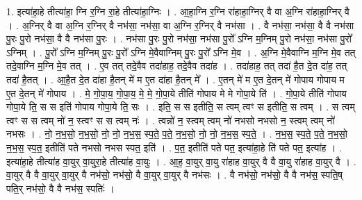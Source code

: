 \documentclass[17pt]{extarticle}
\begin{document}
1. इत्या॑हा॒हे तीत्या॑हा॒ ग्नि र॒ग्नि रा॒हे तीत्या॑हा॒ग्निः । . आ॒हा॒ग्नि र॒ग्नि रा॑हाहा॒ग्निर् वै वा अ॒ग्नि रा॑हाहा॒ग्निर् वै । . अ॒ग्निर् वै वा अ॒ग्नि र॒ग्निर् वै नभ॑सा॒ नभ॑सा॒ वा अ॒ग्नि र॒ग्निर् वै नभ॑सा । . वै नभ॑सा॒ नभ॑सा॒ वै वै नभ॑सा पु॒रः पु॒रो नभ॑सा॒ वै वै नभ॑सा पु॒रः । . नभ॑सा पु॒रः पु॒रो नभ॑सा॒ नभ॑सा पु॒रो᳚ ऽग्नि म॒ग्निम् पु॒रो नभ॑सा॒ नभ॑सा पु॒रो᳚ ऽग्निम् । . पु॒रो᳚ ऽग्नि म॒ग्निम् पु॒रः पु॒रो᳚ ऽग्नि मे॒वैवाग्निम् पु॒रः पु॒रो᳚ ऽग्नि मे॒व । . अ॒ग्नि मे॒वैवाग्नि म॒ग्नि मे॒व तत् तदे॒वाग्नि म॒ग्नि मे॒व तत् । . ए॒व तत् तदे॒वैव तदा॑हाह॒ तदे॒वैव तदा॑ह । . तदा॑हाह॒ तत् तदा॑ है॒त दे॒त दा॑ह॒ तत् तदा॑ है॒तत् । . आ॒है॒त दे॒त दा॑हा है॒तन् मे॑ म ए॒त दा॑हा है॒तन् मे᳚ । . ए॒तन् मे॑ म ए॒त दे॒तन् मे॑ गोपाय गोपाय म ए॒त दे॒तन् मे॑ गोपाय । . मे॒ गो॒पा॒य॒ गो॒पा॒य॒ मे॒ मे॒ गो॒पा॒ये तीति॑ गोपाय मे मे गोपा॒ये ति॑ । . गो॒पा॒ये तीति॑ गोपाय गोपा॒ये ति॒ स स इति॑ गोपाय गोपा॒ये ति॒ सः । . इति॒ स स इतीति॒ स त्वम् त्वꣳ स इतीति॒ स त्वम् । . स त्वम् त्वꣳ स स त्वम् नो॑ न॒ स्त्वꣳ स स त्वम् नः॑ । . त्वन्नो॑ न॒ स्त्वम् त्वम् नो॑ नभसो नभसो न॒ स्त्वम् त्वम् नो॑ नभसः । . नो॒ न॒भ॒सो॒ न॒भ॒सो॒ नो॒ नो॒ न॒भ॒स॒ स्प॒ते॒ प॒ते॒ न॒भ॒सो॒ नो॒ नो॒ न॒भ॒स॒ स्प॒ते॒ । . न॒भ॒स॒ स्प॒ते॒ प॒ते॒ न॒भ॒सो॒ न॒भ॒स॒ स्प॒त॒ इतीति॑ पते नभसो नभस स्पत॒ इति॑ । . प॒त॒ इतीति॑ पते पत॒ इत्या॑हा॒हे ति॑ पते पत॒ इत्या॑ह । . इत्या॑हा॒हे तीत्या॑ह वा॒युर् वा॒युरा॒हे तीत्या॑ह वा॒युः । . आ॒ह॒ वा॒युर् वा॒यु रा॑हाह वा॒युर् वै वै वा॒यु रा॑हाह वा॒युर् वै । . वा॒युर् वै वै वा॒युर् वा॒युर् वै नभ॑सो॒ नभ॑सो॒ वै वा॒युर् वा॒युर् वै नभ॑सः । . वै नभ॑सो॒ नभ॑सो॒ वै वै नभ॑स॒ स्पति॒ष् पति॒र् नभ॑सो॒ वै वै नभ॑स॒ स्पतिः॑ । \newline
\end{document}
